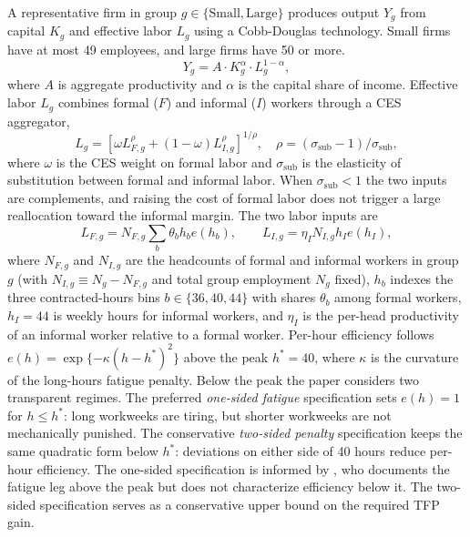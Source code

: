 
A representative firm in group $g\in\{\text{Small},\text{Large}\}$ produces output $Y_g$ from capital $K_g$ and effective labor $L_g$ using a Cobb-Douglas technology. Small firms have at most 49 employees, and large firms have 50 or more.
\begin{equation}\label{eq:production}
    Y_g = A\cdot K_g^{\alpha}\cdot L_g^{1-\alpha},
\end{equation}
where $A$ is aggregate productivity and $\alpha$ is the capital share of income. Effective labor $L_g$ combines formal ($F$) and informal ($I$) workers through a CES aggregator,
\begin{equation}\label{eq:ces}
    L_g = \left[\omega L_{F,g}^{\rho} + (1-\omega)L_{I,g}^{\rho}\right]^{1/\rho},\quad \rho=(\sigma_{\text{sub}}-1)/\sigma_{\text{sub}},
\end{equation}
where $\omega$ is the CES weight on formal labor and $\sigma_{\text{sub}}$ is the elasticity of substitution between formal and informal labor. When $\sigma_{\text{sub}}<1$ the two inputs are complements, and raising the cost of formal labor does not trigger a large reallocation toward the informal margin. The two labor inputs are
\[
L_{F,g}=N_{F,g}\sum_b\theta_b h_b e(h_b),\qquad L_{I,g}=\eta_I N_{I,g} h_I e(h_I),
\]
where $N_{F,g}$ and $N_{I,g}$ are the headcounts of formal and informal workers in group $g$ (with $N_{I,g}\equiv N_g-N_{F,g}$ and total group employment $N_g$ fixed), $h_b$ indexes the three contracted-hours bins $b\in\{36,40,44\}$ with shares $\theta_b$ among formal workers, $h_I=44$ is weekly hours for informal workers, and $\eta_I$ is the per-head productivity of an informal worker relative to a formal worker. Per-hour efficiency follows $e(h)=\exp\{-\kappa(h-h^*)^2\}$ above the peak $h^*=40$, where $\kappa$ is the curvature of the long-hours fatigue penalty. Below the peak the paper considers two transparent regimes. The preferred \emph{one-sided fatigue} specification sets $e(h)=1$ for $h\leq h^*$: long workweeks are tiring, but shorter workweeks are not mechanically punished. The conservative \emph{two-sided penalty} specification keeps the same quadratic form below $h^*$: deviations on either side of 40 hours reduce per-hour efficiency. The one-sided specification is informed by \citet{Pencavel2015}, who documents the fatigue leg above the peak but does not characterize efficiency below it. The two-sided specification serves as a conservative upper bound on the required TFP gain.


